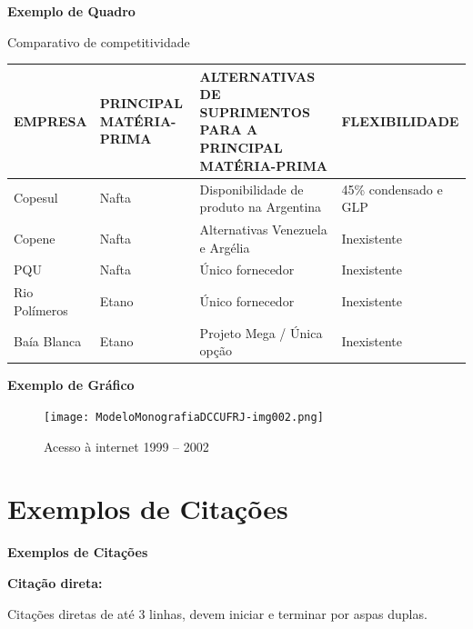\bigskip

{\centering\bfseries\color{red}
Exemplo de Quadro
\par}

\begin{quadro}[htb]
\centering
\caption{Comparativo de competitividade}
\begin{supertabular}{|m{2.5cm}|m{2.5cm}|m{6.0cm}|m{3.2cm}|}
\hline
{ EMPRESA } &
{ PRINCIPAL MATÉRIA-PRIMA } &
{ ALTERNATIVAS DE SUPRIMENTOS PARA A PRINCIPAL MATÉRIA-PRIMA } &
{ FLEXIBILIDADE }\\\hline
{ Copesul } &
{ Nafta } &
{ Disponibilidade de produto na Argentina} &
{ 45\% condensado e GLP }\\\hline
{ Copene } &
{ Nafta } &
{ Alternativas Venezuela e Argélia } &
{ Inexistente }\\\hline
{ PQU } &
{ Nafta } &
{ Único fornecedor } &
{ Inexistente }\\\hline
{ Rio Polímeros } &
{ Etano } &
{ Único fornecedor } &
{ Inexistente }\\\hline
{ Baía Blanca } &
{ Etano } &
{ Projeto Mega / Única opção } &
{ Inexistente }\\\hline
\end{supertabular}
    \label{quad:quadro1}
\end{quadro}

\bigskip
\clearpage

{\centering\bfseries\color{red}
Exemplo de Gráfico
\par}
\begin{figure}[ht]
    \centering
    \caption{Acesso à internet 1999 – 2002}
    \texttt{[image: ModeloMonografiaDCCUFRJ-img002.png]} 
    \label{fig:internet}
\end{figure}


\clearpage
\section{Exemplos de Citações}
{\centering\bfseries\color{red}
Exemplos de Citações
\par}

{\centering\bfseries\color{red}
Citação direta:
\par}

\bigskip

Citações diretas de até 3 linhas, devem iniciar e terminar por aspas duplas.\\

